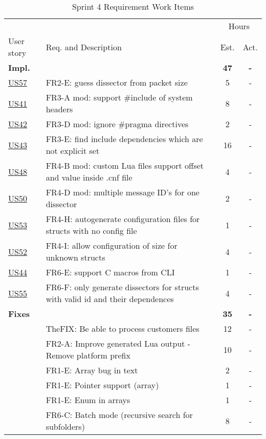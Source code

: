 \begin{table}[!htb] \small \center
\caption{Sprint 4 Requirement Work Items \label{tab:sprint4req}}
\begin{tabularx}{\textwidth}{l X c c}
	\toprule
	& & \multicolumn{2}{c}{Hours} \\
	\cmidrule(r){3-4}
	User story & Req. and Description & Est. & Act. \\
	\midrule
	\textbf{Impl.} &  & \textbf{47} & \textbf{-} \\
	\hyperref[tab:req:stories13]{US57} & FR2-E: guess dissector from packet size & 5 & - \\
 	\hyperref[tab:req:stories10]{US41} & FR3-A mod: support \#include of system headers &  8  & - \\
	\hyperref[tab:req:stories10]{US42} & FR3-D mod: ignore \#pragma directives & 2 & - \\
	\hyperref[tab:req:stories10]{US43} & FR3-E: find include dependencies which are not explicit set & 16  & - \\
	\hyperref[tab:req:stories11]{US48} & FR4-B mod: custom Lua files support offset and value inside .cnf file & 4 & - \\
	\hyperref[tab:req:stories12]{US50} & FR4-D mod: multiple message ID's for one dissector & 2 & - \\
	\hyperref[tab:req:stories12]{US53} & FR4-H: autogenerate configuration files for structs with no config file & 1  & - \\
	\hyperref[tab:req:stories12]{US52} & FR4-I: allow configuration of size for unknown structs & 4 & - \\
	\hyperref[tab:req:stories10]{US44} & FR6-E: support C macros from CLI & 1 & - \\
	\hyperref[tab:req:stories12]{US55} & FR6-F: only generate dissectors for structs with valid id and their dependences & 4 & - \\
	\addlinespace
	\textbf{Fixes} &  & \textbf{35} & \textbf{-} \\
	& TheFIX: Be able to process customers files & 12 & - \\
	 & FR2-A: Improve generated Lua output - Remove platform prefix & 10 & - \\
	 & FR1-E: Array bug in text & 2 & - \\
	 & FR1-E: Pointer support (array) & 1 & - \\
	 & FR1-E: Enum in arrays & 1 & - \\		
	 & FR6-C: Batch mode (recursive search for subfolders) &  8  & - \\

\end{tabularx}
\end{table}
